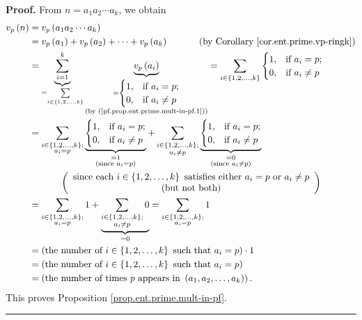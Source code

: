 \documentclass[numbers=enddot,12pt,final,onecolumn,notitlepage]{scrartcl}%
\numberwithin{exer}{subsection}
\theoremstyle{definition}
\newenvironment{proof}[1][Proof]{\noindent\textbf{#1.} }{\ \rule{0.5em}{0.5em}}
\let\sumnonlimits\sum
\renewcommand{\sum}{\sumnonlimits\limits}
\begin{document}
\begin{proof}
From $n=a_{1}a_{2}\cdots a_{k}$, we obtain%
\begin{align*}
v_{p}\left(  n\right)   &  =v_{p}\left(  a_{1}a_{2}\cdots a_{k}\right) \\
&  =v_{p}\left(  a_{1}\right)  +v_{p}\left(  a_{2}\right)  +\cdots
+v_{p}\left(  a_{k}\right)  \ \ \ \ \ \ \ \ \ \ \left(  \text{by Corollary
\ref{cor.ent.prime.vp-ringk}}\right) \\
&  =\underbrace{\sum_{i=1}^{k}}_{=\sum_{i\in\left\{  1,2,\ldots,k\right\}  }%
}\underbrace{v_{p}\left(  a_{i}\right)  }_{\substack{=%
\begin{cases}
1, & \text{if }a_{i}=p;\\
0, & \text{if }a_{i}\neq p
\end{cases}
\\\text{(by (\ref{pf.prop.ent.prime.mult-in-pf.1}))}}}=\sum_{i\in\left\{
1,2,\ldots,k\right\}  }%
\begin{cases}
1, & \text{if }a_{i}=p;\\
0, & \text{if }a_{i}\neq p
\end{cases}
\\
&  =\sum_{\substack{i\in\left\{  1,2,\ldots,k\right\}  ;\\a_{i}=p}%
}\underbrace{%
\begin{cases}
1, & \text{if }a_{i}=p;\\
0, & \text{if }a_{i}\neq p
\end{cases}
}_{\substack{=1\\\text{(since }a_{i}=p\text{)}}}+\sum_{\substack{i\in\left\{
1,2,\ldots,k\right\}  ;\\a_{i}\neq p}}\underbrace{%
\begin{cases}
1, & \text{if }a_{i}=p;\\
0, & \text{if }a_{i}\neq p
\end{cases}
}_{\substack{=0\\\text{(since }a_{i}\neq p\text{)}}}\\
&  \ \ \ \ \ \ \ \ \ \ \left(
\begin{array}
[c]{c}%
\text{since each }i\in\left\{  1,2,\ldots,k\right\}  \text{ satisfies either
}a_{i}=p\text{ or }a_{i}\neq p\\
\text{(but not both)}%
\end{array}
\right) \\
&  =\sum_{\substack{i\in\left\{  1,2,\ldots,k\right\}  ;\\a_{i}=p}%
}1+\underbrace{\sum_{\substack{i\in\left\{  1,2,\ldots,k\right\}  ;\\a_{i}\neq
p}}0}_{=0}=\sum_{\substack{i\in\left\{  1,2,\ldots,k\right\}  ;\\a_{i}=p}}1\\
&  =\left(  \text{the number of }i\in\left\{  1,2,\ldots,k\right\}  \text{
such that }a_{i}=p\right)  \cdot1\\
&  =\left(  \text{the number of }i\in\left\{  1,2,\ldots,k\right\}  \text{
such that }a_{i}=p\right) \\
&  =\left(  \text{the number of times }p\text{ appears in }\left(  a_{1}%
,a_{2},\ldots,a_{k}\right)  \right)  .
\end{align*}
This proves Proposition \ref{prop.ent.prime.mult-in-pf}.
\end{proof}
\end{document}
